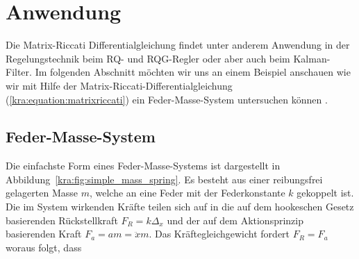 \section{Anwendung \label{kra:section:anwendung}}

Die Matrix-Riccati Differentialgleichung findet unter anderem Anwendung in der Regelungstechnik beim RQ- und RQG-Regler oder aber auch beim Kalman-Filter.
Im folgenden Abschnitt möchten wir uns an einem Beispiel anschauen wie wir mit Hilfe der Matrix-Riccati-Differentialgleichung (\ref{kra:equation:matrixriccati}) ein Feder-Masse-System untersuchen können \cite{kra:riccati}.

\subsection{Feder-Masse-System}
\label{kra:subsection:feder-masse-system}
Die einfachste Form eines Feder-Masse-Systems ist dargestellt in Abbildung~\ref{kra:fig:simple_mass_spring}.
Es besteht aus einer reibungsfrei gelagerten Masse $m$, welche an eine Feder mit der Federkonstante $k$ gekoppelt ist.
Die im System wirkenden Kräfte teilen sich auf in die auf dem hookeschen Gesetz basierenden Rückstellkraft $F_R = k \Delta_x$ und der auf dem Aktionsprinzip basierenden Kraft $F_a = am = \ddot{x} m$.
Das Kräftegleichgewicht fordert $F_R = F_a$ woraus folgt, dass

